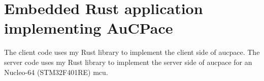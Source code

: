\chapter{Embedded Rust application implementing AuCPace}
\label{chap:appendix-aucpace-embedded}

The client code uses my Rust library to implement the client side of \gls{aucpace}.
The server code uses my Rust library to implement the server side of \gls{aucpace} for an Nucleo-64 (STM32F401RE) \gls{mcu}.


